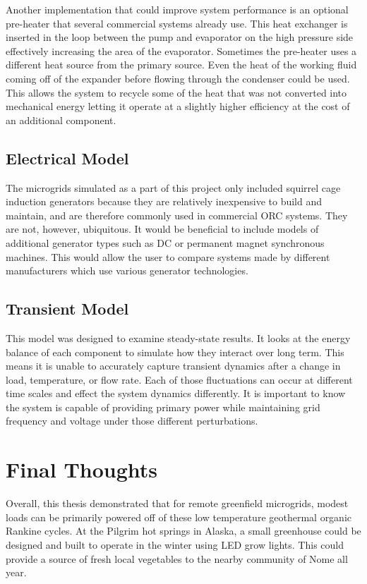 Another implementation that could improve system performance is an optional pre-heater that several commercial systems already use. This heat exchanger is inserted in the loop between the pump and evaporator on the high pressure side effectively increasing the area of the evaporator. Sometimes the pre-heater uses a different heat source from the primary source. Even the heat of the working fluid coming off of the expander before flowing through the condenser could be used. This allows the system to recycle some of the heat that was not converted into mechanical energy letting it operate at a slightly higher efficiency at the cost of an additional component.

\subsection{Electrical Model}
The microgrids simulated as a part of this project only included squirrel cage induction generators because they are relatively inexpensive to build and maintain, and are therefore commonly used in commercial ORC systems. They are not, however, ubiquitous. It would be beneficial to include models of additional generator types such as DC or permanent magnet synchronous machines. This would allow the user to compare systems made by different manufacturers which use various generator technologies.

\subsection{Transient Model}
This model was designed to examine steady-state results. It looks at the energy balance of each component to simulate how they interact over long term. This means it is unable to accurately capture transient dynamics after a change in load, temperature, or flow rate. Each of those fluctuations can occur at different time scales and effect the system dynamics differently. It is important to know the system is capable of providing primary power while maintaining grid frequency and voltage under those different perturbations.

\section{Final Thoughts}
Overall, this thesis demonstrated that for remote greenfield microgrids, modest loads can be primarily powered off of these low temperature geothermal organic Rankine cycles. At the Pilgrim hot springs in Alaska, a small greenhouse could be designed and built to operate in the winter using LED grow lights. This could provide a source of fresh local vegetables to the nearby community of Nome all year. 

